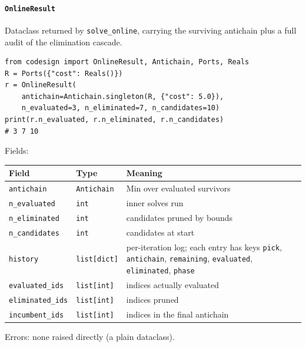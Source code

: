 \documentclass[11pt,a4paper]{article}
\begin{document}
\paragraph{\texttt{OnlineResult}}\label{ref:online:onlineresult}
Dataclass returned by \texttt{solve\_online}, carrying the surviving
antichain plus a full audit of the elimination cascade.
\begin{lstlisting}
from codesign import OnlineResult, Antichain, Ports, Reals
R = Ports({"cost": Reals()})
r = OnlineResult(
    antichain=Antichain.singleton(R, {"cost": 5.0}),
    n_evaluated=3, n_eliminated=7, n_candidates=10)
print(r.n_evaluated, r.n_eliminated, r.n_candidates)
# 3 7 10
\end{lstlisting}
Fields:
\begin{center}
\begin{tabular}{@{}lll@{}}
\toprule
Field & Type & Meaning \\
\midrule
\texttt{antichain} & \texttt{Antichain} & Min over evaluated survivors \\
\texttt{n\_evaluated} & \texttt{int} & inner solves run \\
\texttt{n\_eliminated} & \texttt{int} & candidates pruned by bounds \\
\texttt{n\_candidates} & \texttt{int} & candidates at start \\
\texttt{history} & \texttt{list[dict]} & per-iteration log; each entry has keys \texttt{pick}, \texttt{antichain}, \texttt{remaining}, \texttt{evaluated}, \texttt{eliminated}, \texttt{phase} \\
\texttt{evaluated\_ids} & \texttt{list[int]} & indices actually evaluated \\
\texttt{eliminated\_ids} & \texttt{list[int]} & indices pruned \\
\texttt{incumbent\_ids} & \texttt{list[int]} & indices in the final antichain \\
\bottomrule
\end{tabular}
\end{center}
Errors: none raised directly (a plain dataclass).
\end{document}

